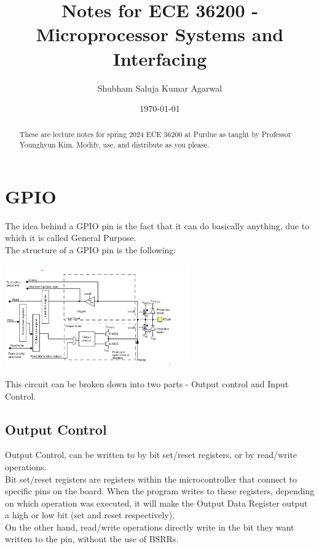 \documentclass[nobib]{tufte-handout}
\title{Notes for ECE 36200 - Microprocessor Systems and Interfacing}
\author[Shubham Saluja Kumar Agarwal]{Shubham Saluja Kumar Agarwal}
\date{\today}  %
\begin{document}
\maketitle

\begin{abstract}
    These are lecture notes for spring 2024 ECE 36200 at Purdue as taught by Professor Younghyun Kim. Modify, use, and distribute as you please.
\end{abstract}

\tableofcontents

\newpage
\section{GPIO}

The idea behind a GPIO pin is the fact that it can do basically anything, due
to which it is called General Purpose.\\

The structure of a GPIO pin is the following:\\
\begin{center}
    \includegraphics[width = 300px]{images/gpio_circuitry.png}
\end{center}

This circuit can be broken down into two parts - Output control and Input
Control.

\subsection{Output Control}

Output Control, can be written to by bit set/reset registers, or by read/write
operations.\\ Bit set/reset registers are registers within the microcontroller
that connect to specific pins on the board. When the program writes to these
registers, depending on which operation was executed, it will make the Output
Data Register output a high or low bit (set and reset respectively).\\ On the
other hand, read/write operations directly write in the bit they want written
to the pin, without the use of BSRRs.\\
\end{document}
